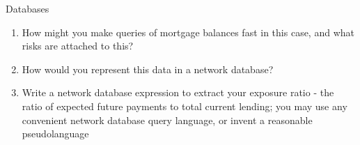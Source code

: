 \documentclass{tripos}
\begin{document}
\begin{question}[MockIA,year=2025,paper=1,question=4,author=rrw]{Databases}
\begin{enumerate}
  \item How might you make queries of mortgage balances fast in this case, and what risks are attached to this? 
  \item How would you represent this data in a network database? 
  \item Write a network database expression to extract your exposure ratio - the ratio of expected future payments to total current lending; you may use any convenient network database query language, or invent a reasonable pseudolanguage 
  \end{enumerate}
\end{question}
\eject
\end{document}
